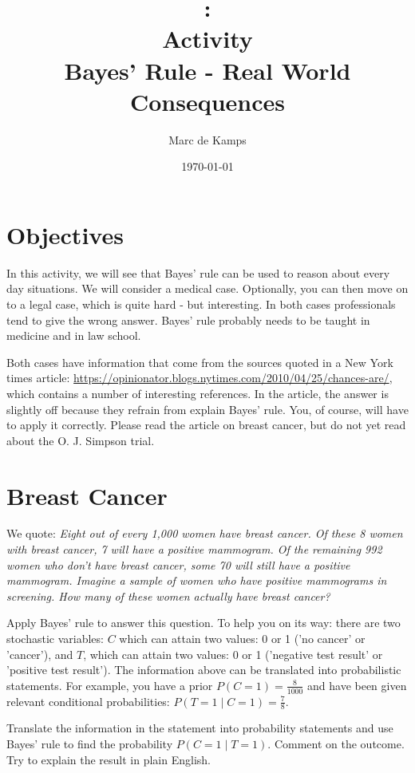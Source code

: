 \documentclass[a4wide]{article}
\title{\modulecode: \modulename\\
         Activity\\
       Bayes' Rule - Real World Consequences 
}
\author{Marc de Kamps}
\date{\today}
\begin{document}
\maketitle

\section*{Objectives}
In this activity, we will see that Bayes' rule can be used to reason about every day
situations. We will consider a medical case. Optionally, you can then move on
to a legal case, which is quite hard - but interesting. In both cases professionals
tend to give the wrong answer. Bayes' rule probably needs to be taught in
medicine and in law school.

Both cases have information that come from the sources quoted in a New York times
article: \url{https://opinionator.blogs.nytimes.com/2010/04/25/chances-are/}, which
contains a number of interesting references. In the article, the answer is slightly off
because they refrain from explain Bayes' rule. You, of course, will have to apply
it correctly. Please read the article on breast cancer, but do not yet read about the
O. J. Simpson trial.

\section*{Breast Cancer}
We quote:
\emph{Eight out of every 1,000 women have breast cancer.  Of these 8 women with breast cancer, 7 will have a positive mammogram.  Of the remaining 992 women who don’t have breast cancer, some 70 will still have a positive mammogram.  Imagine a sample of women who have positive mammograms in screening.  How many of these women actually have breast cancer?}

Apply Bayes' rule to answer this question. To help you on its way: there are two
stochastic variables: $C$ which can attain two values: 0 or 1 ('no cancer' or 'cancer'),
and $T$, which can attain two values: 0 or 1 ('negative test result' or 'positive test result'). The information above can be translated into
probabilistic statements. For example, you have a prior $P(C=1) = \frac{8}{1000}$ and
have been given relevant conditional probabilities: $P(T=1 \mid C=1) = \frac{7}{8}$.

Translate the information in the statement into probability statements and use
Bayes' rule to find the probability $P(C=1 \mid T =1 )$. Comment on the outcome. Try
to explain the result in plain English.
\end{document}
